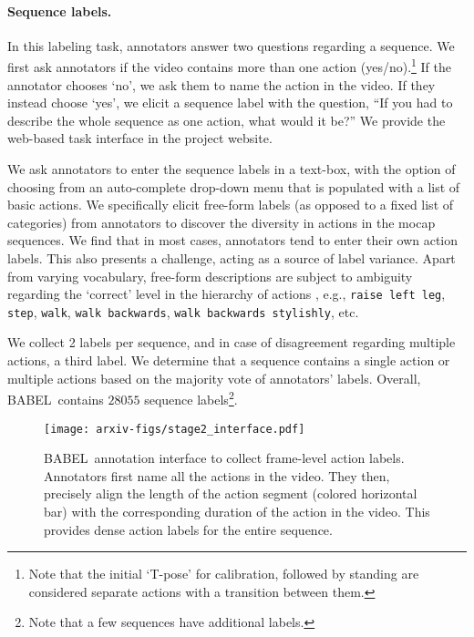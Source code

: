 \documentclass[final]{cvpr}
\def\babel{BABEL}
\begin{document}
\noindent
\paragraph{Sequence labels.}
In this labeling task, annotators answer two questions regarding a sequence. 
We first ask annotators if the video contains more than one action (yes/no).\footnote{Note that the initial `T-pose' for calibration, followed by standing are considered separate actions with a transition between them.} 
If the annotator chooses `no', we ask them to name the action in the video. 
If they instead choose `yes', we elicit a sequence label with the question, ``If you had to describe the whole sequence as one action, what would it be?'' 
We provide the web-based task interface in the project website. 

We ask annotators to enter the sequence labels in a text-box, with the option of choosing from an auto-complete drop-down menu that is populated with a list of basic actions. 
We specifically elicit free-form labels (as opposed to a fixed list of categories) from annotators to discover the diversity in actions in the mocap sequences. 
We find that in most cases, annotators tend to enter their own action labels. 
This also presents a challenge, acting as a source of label variance. Apart from varying vocabulary, free-form descriptions are subject to ambiguity regarding the `correct' level in the hierarchy of actions \cite{DBLP:conf/cvpr/GuSRVPLVTRSSM18}, e.g., \texttt{raise left leg}, \texttt{step}, \texttt{walk}, \texttt{walk backwards}, \texttt{walk backwards stylishly}, etc. 

We collect 2 labels per sequence, and in case of disagreement regarding multiple actions, a third label. 
We determine that a sequence contains a single action or multiple actions based on the majority vote of annotators' labels. 
Overall, \babel~contains $28055$ sequence labels\footnote{Note that a few sequences have additional labels.}. 

\begin{figure}[t!]
    \centering
    \texttt{[image: arxiv-figs/stage2\_interface.pdf]}
    \caption{
        \babel~annotation interface to collect frame-level action labels. 
        Annotators first name all the actions in the video. 
        They then, precisely align the length of the action segment (colored horizontal bar) with the corresponding duration of the action in the video. 
        This provides dense action labels for the entire sequence. 
    }
    \label{fig:stage2_interface}
\end{figure}
 
\end{document}
